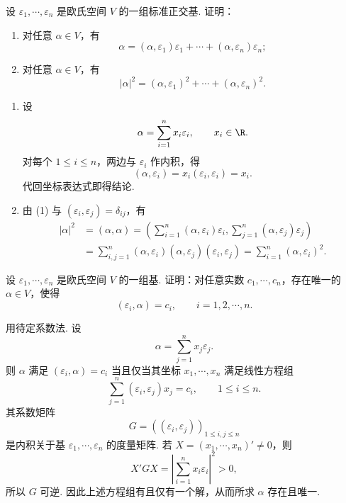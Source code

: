 \begin{problem}

	设 $\varepsilon_1,\cdots,\varepsilon_n$ 是欧氏空间 $V$ 的一组标准正交基. 证明：
	\begin{enumerate}
		\item 对任意 $\alpha\in V$，有
		\[
		\alpha=(\alpha,\varepsilon_1)\varepsilon_1+\cdots+(\alpha,\varepsilon_n)\varepsilon_n;
		\]
		\item 对任意 $\alpha\in V$，有
		\[
		|\alpha|^2=(\alpha,\varepsilon_1)^2+\cdots+(\alpha,\varepsilon_n)^2.
		\]
	\end{enumerate}
\end{problem}
\begin{solution}
	\begin{enumerate}
		\item 设
		\[
		\alpha=\sum_{i=1}^n x_i\varepsilon_i,
		\qquad x_i\in\R.
		\]
		对每个 $1\leqslant i\leqslant n$，两边与 $\varepsilon_i$ 作内积，得
		\[
		(\alpha,\varepsilon_i)=x_i(\varepsilon_i,\varepsilon_i)=x_i.
		\]
		代回坐标表达式即得结论.
		\item 由 (1) 与 $(\varepsilon_i,\varepsilon_j)=\delta_{ij}$，有
		\[
		\begin{aligned}
			|\alpha|^2
			&=(\alpha,\alpha)
			=\left(\sum_{i=1}^n(\alpha,\varepsilon_i)\varepsilon_i,
			\sum_{j=1}^n(\alpha,\varepsilon_j)\varepsilon_j\right) \\
			&=\sum_{i,j=1}^n(\alpha,\varepsilon_i)(\alpha,\varepsilon_j)(\varepsilon_i,\varepsilon_j)
			=\sum_{i=1}^n(\alpha,\varepsilon_i)^2.
		\end{aligned}
		\]
	\end{enumerate}
\end{solution}

\begin{problem}

	设 $\varepsilon_1,\cdots,\varepsilon_n$ 是欧氏空间 $V$ 的一组基. 证明：对任意实数
	$c_1,\cdots,c_n$，存在唯一的 $\alpha\in V$，使得
	\[
	(\varepsilon_i,\alpha)=c_i,
	\qquad i=1,2,\cdots,n.
	\]
\end{problem}
\begin{solution}
	用待定系数法. 设
	\[
	\alpha=\sum_{j=1}^n x_j\varepsilon_j.
	\]
	则 $\alpha$ 满足 $(\varepsilon_i,\alpha)=c_i$ 当且仅当其坐标 $x_1,\cdots,x_n$ 满足线性方程组
	\[
	\sum_{j=1}^n(\varepsilon_i,\varepsilon_j)x_j=c_i,
	\qquad 1\leqslant i\leqslant n.
	\]
	其系数矩阵
	\[
	G=((\varepsilon_i,\varepsilon_j))_{1\leqslant i,j\leqslant n}
	\]
	是内积关于基 $\varepsilon_1,\cdots,\varepsilon_n$ 的度量矩阵. 若 $X=(x_1,\cdots,x_n)'\ne0$，则
	\[
	X'GX=\left|\sum_{i=1}^n x_i\varepsilon_i\right|^2>0,
	\]
	所以 $G$ 可逆. 因此上述方程组有且仅有一个解，从而所求 $\alpha$ 存在且唯一.
\end{solution}

